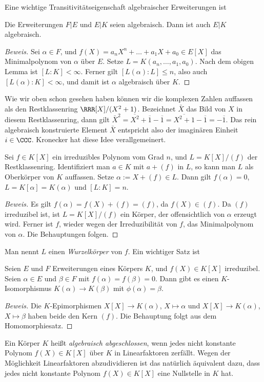 \documentclass[12pt,a4paper,twoside]{article}
\newcommand{\ei}[1]{\emph{#1}\index{#1}}
\begin{document}
Eine wichtige Transitivit\"atseigenschaft algebraischer Erweiterungen ist
\begin{Satz}\label{S:algtran}
  Die Erweiterungen $F|E$ und $E|K$ seien algebraisch. Dann ist auch $E|K$
  algebraisch.
\end{Satz}
\begin{proof}[Beweis]
  Sei $\alpha\in F$, und $f(X)=a_nX^n+\dots+a_1X+a_0\in E[X]$ das
  Minimalpolynom von $\alpha$ \"uber $E$. Setze $L=K(a_n,\dots,a_1,a_0)$. Nach
  dem obigen Lemma ist $[L:K]<\infty$. Ferner gilt $[L(\alpha):L]\le n$, also
  auch $[L(\alpha):K]<\infty$, und damit ist $\alpha$ algebraisch \"uber $K$.
\end{proof}
Wie wir oben schon gesehen haben k\"onnen wir die komplexen Zahlen auffassen
als den Restklassenring $\RRR[X]/(X^2+1)$. Bezeichnet $\bar X$ das Bild von
$X$ in diesem Restklassenring, dann gilt $\bar
X^2=\overline{X^2}+\overline{1}-\overline{1}=
\overline{X^2+1}-\overline{1}=-\overline{1}$.  Das rein algebraisch
konstruierte Element $\bar X$ entspricht also der imagin\"aren Einheit
$i\in\CCC$. Kronecker hat diese Idee verallgemeinert.
\begin{Satz}
  Sei $f\in K[X]$ ein irreduzibles Polynom vom Grad $n$, und $L=K[X]/(f)$ der
  Restklassenring. Identifiziert man $a\in K$ mit $a+(f)$ in $L$, so kann man
  $L$ als Oberk\"orper von $K$ auffassen. Setze $\alpha:=X+(f)\in L$. Dann gilt
  $f(\alpha)=0$, $L=K[\alpha]=K(\alpha)$ und $[L:K]=n$.
\end{Satz}
\begin{proof}[Beweis]
  Es gilt $f(\alpha)=f(X)+(f)=(f)$, da $f(X)\in(f)$. Da $(f)$ irreduzibel ist,
  ist $L=K[X]/(f)$ ein K\"orper, der offensichtlich von $\alpha$ erzeugt
  wird. Ferner ist $f$, wieder wegen der Irreduzibilit\"at von $f$, das
  Minimalpolynom von $\alpha$. Die Behauptungen folgen.
\end{proof}
Man nennt $L$ einen \ei{Wurzelk\"orper} von $f$. Ein wichtiger Satz ist
\begin{Satz}
  Seien $E$ und $F$ Erweiterungen eines K\"orpers $K$, und $f(X)\in K[X]$
  irreduzibel. Seien $\alpha\in E$ und $\beta\in F$ mit
  $f(\alpha)=f(\beta)=0$. Dann gibt es einen $K$-Isomorphismus $K(\alpha)\to
  K(\beta)$ mit $\phi(\alpha)=\beta$.
\end{Satz}
\begin{proof}[Beweis]
  Die $K$-Epimorphismen $X[X]\to K(\alpha)$, $X\mapsto\alpha$ und $X[X]\to
  K(\alpha)$, $X\mapsto\beta$ haben beide den Kern $(f)$. Die Behauptung folgt
  aus dem Homomorphiesatz.
\end{proof}
Ein K\"orper $K$ hei\ss t \ei{algebraisch abgeschlossen}, wenn jedes nicht
konstante Polynom $f(X)\in K[X]$ \"uber $K$ in Linearfaktoren zerf\"allt.
Wegen der M\"oglichkeit Linearfaktoren abzudividieren ist das nat\"urlich
\"aquivalent dazu, dass jedes nicht konstante Polynom $f(X)\in K[X]$ eine
Nullstelle in $K$ hat.
\end{document}
